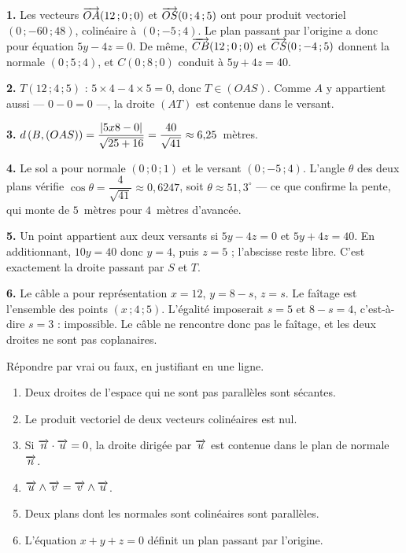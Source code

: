 \begin{corrige}
\textbf{1.} Les vecteurs $\overrightarrow{OA}(12\,;0\,;0)$ et $\overrightarrow{OS}(0\,;4\,;5)$ ont
pour produit vectoriel $(0\,;-60\,;48)$, colinéaire à $(0\,;-5\,;4)$. Le plan passant par
l'origine a donc pour équation $5y-4z = 0$. De même,
$\overrightarrow{CB}(12\,;0\,;0)$ et $\overrightarrow{CS}(0\,;-4\,;5)$ donnent la normale
$(0\,;5\,;4)$, et $C(0\,;8\,;0)$ conduit à $5y+4z = 40$.

\textbf{2.} $T(12\,;4\,;5)$ : $5 \times 4-4 \times 5 = 0$, donc
$T \in (OAS)$. Comme $A$ y appartient aussi — $0-0 = 0$ —, la droite $(AT)$
est contenue dans le versant.

\textbf{3.} $d\left(B,(OAS)\right) = \dfrac{\left|5 x 8-0\right|}{\sqrt{25+16}}
= \dfrac{40}{\sqrt{41}} \approx 6{,}25$~mètres.

\textbf{4.} Le sol a pour normale $(0\,;0\,;1)$ et le versant $(0\,;-5\,;4)$.
L'angle $\theta$ des deux plans vérifie
$\cos\theta = \dfrac{4}{\sqrt{41}} \approx 0{,}6247$, soit
$\theta \approx 51{,}3^{\circ}$ — ce que confirme la pente, qui monte de
$5$~mètres pour $4$~mètres d'avancée.

\textbf{5.} Un point appartient aux deux versants si $5y-4z = 0$ et
$5y+4z = 40$. En additionnant, $10y = 40$ donc $y = 4$, puis $z = 5$ ;
l'abscisse reste libre. C'est exactement la droite passant par $S$ et $T$.

\textbf{6.} Le câble a pour représentation $x = 12$, $y = 8-s$, $z = s$. Le
faîtage est l'ensemble des points $(x\,;4\,;5)$. L'égalité imposerait
$s = 5$ et $8-s = 4$, c'est-à-dire $s = 3$ : impossible. Le câble ne
rencontre donc pas le faîtage, et les deux droites ne sont pas coplanaires.
\end{corrige}

\begin{jemeteste}
Répondre par vrai ou faux, en justifiant en une ligne.

\begin{enumerate}[label=\textbf{\arabic*.}, leftmargin=*, itemsep=0.28em]
  \item Deux droites de l'espace qui ne sont pas parallèles sont sécantes.
  \item Le produit vectoriel de deux vecteurs colinéaires est nul.
  \item Si $\overrightarrow{n} \cdot \overrightarrow{u} = 0$, la droite dirigée par $\overrightarrow{u}$ est
        contenue dans le plan de normale $\overrightarrow{n}$.
  \item $\overrightarrow{u} \wedge \overrightarrow{v} = \overrightarrow{v} \wedge \overrightarrow{u}$.
  \item Deux plans dont les normales sont colinéaires sont parallèles.
  \item L'équation $x+y+z = 0$ définit un plan passant par l'origine.
\end{enumerate}
\end{jemeteste}

